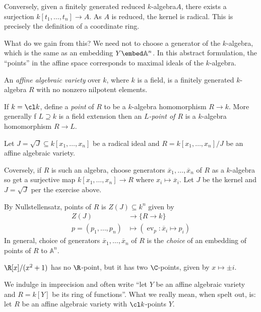 \documentclass[a4paper]{article}
\renewcommand{\A}{\mathbb{A}}
\begin{document}
Conversely, given a finitely generated reduced \(k\)-algebra\(A\), there exists a surjection \(k[t_1, \dots, t_n] \to A\). As \(A\) is reduced, the kernel is radical. This is precisely the definition of a coordinate ring.

What do we gain from this? We need not to choose a generator of the \(k\)-algebra, which is the same as an embedding \(Y \embed \A^n\). In this abstract formulation, the ``points'' in the affine space corresponds to maximal ideals of the \(k\)-algebra.

\begin{definition}
  An \emph{affine algebraic variety} over \(k\), where \(k\) is a field, is a finitely generated \(k\)-algebra \(R\) with no nonzero nilpotent elements.

  If \(k = \cl k\), define a \emph{point} of \(R\) to be a \(k\)-algebra homomorphism \(R \to k\). More generally f \(L \supseteq k\) is a field extension then an \emph{\(L\)-point of \(R\)} is a \(k\)-algebra homomorphism \(R \to L\).
\end{definition}

\begin{eg}
  Let \(J = \sqrt J \subseteq k[x_1, \dots, x_n]\) be a radical ideal and \(R = k[x_1, \dots, x_n]/J\) be an affine algebraic variety.
  
  Coversely, if \(R\) is such an algebra, choose generators \(\overline x_1, \dots, \overline x_n\) of \(R\) as a \(k\)-algebra so get a surjective map \(k[x_1, \dots, x_n] \to R\) where \(x_i \mapsto \overline x_i\). Let \(J\) be the kernel and \(J = \sqrt J\) per the exercise above.

  By Nullstellensatz, points of \(R\) is \(Z(J) \subseteq k^n\) given by
  \begin{align*}
    Z(J) &\to \{R \to k\} \\
    p = (p_1, \dots, p_n) &\mapsto (\operatorname{ev}_p: \overline x_i \mapsto p_i)
  \end{align*}
  In general, choice of generators \(\overline x_1, \dots, \overline x_n\) of \(R\) is the \emph{choice} of an embedding of points of \(R\) to \(\A^n\).
\end{eg}

\begin{eg}
  \(\R[x]/(x^2 + 1)\) has no \(\R\)-point, but it has two \(\C\)-points, given by \(x \mapsto \pm i\).
\end{eg}

We indulge in imprecision and often write ``let \(Y\) be an affine algebraic variety and \(R = k[Y]\) be its ring of functions''. What we really mean, when spelt out, is: let \(R\) be an affine algebraic variety with \(\cl k\)-points \(Y\).
\end{document}
